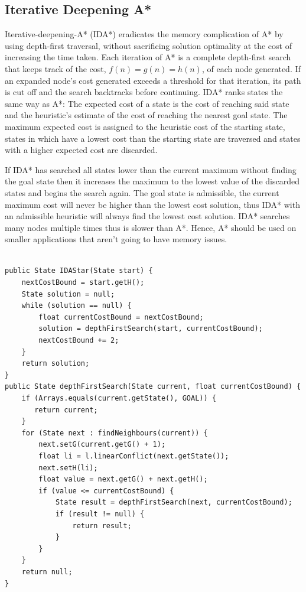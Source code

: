 \documentclass[final]{cmpreport}
\begin{document}
\subsection{Iterative Deepening A*}
Iterative-deepening-A* (IDA*) eradicates the memory complication of A* by using depth-first traversal, without sacrificing solution optimality at the cost of increasing the time taken. Each iteration of A* is a complete depth-first search that keeps track of the cost, $f(n) = g(n) = h(n)$, of each node generated. If an expanded node's cost generated exceeds a threshold for that iteration, its path is cut off and the search backtracks before continuing. IDA* ranks states the same way as A*: The expected cost of a state is the cost of reaching said state and the heuristic's estimate of the cost of reaching the nearest goal state. The maximum expected cost is assigned to the heuristic cost of the starting state, states in which have a lowest cost than the starting state are traversed and states with a higher expected cost are discarded. 


If IDA* has searched all states lower than the current maximum without finding the goal state then it increases the maximum to the lowest value of the discarded states and begins the search again. The goal state is admissible, the current maximum cost will never be higher than the lowest cost solution, thus IDA* with an admissible heuristic will always find the lowest cost solution.  IDA* searches many nodes multiple times thus is slower than A*. Hence, A* should be used on smaller applications that aren't going to have memory issues.

\begin{verbatim}

public State IDAStar(State start) {
    nextCostBound = start.getH();
    State solution = null;
    while (solution == null) {
        float currentCostBound = nextCostBound;
        solution = depthFirstSearch(start, currentCostBound);
        nextCostBound += 2;
    }
    return solution;
}
public State depthFirstSearch(State current, float currentCostBound) {
    if (Arrays.equals(current.getState(), GOAL)) {
       return current;
    }
    for (State next : findNeighbours(current)) {
        next.setG(current.getG() + 1);
        float li = l.linearConflict(next.getState());
        next.setH(li);
        float value = next.getG() + next.getH();
        if (value <= currentCostBound) {
            State result = depthFirstSearch(next, currentCostBound);
            if (result != null) {
                return result;
            }
        }
    }
    return null;
}

\end{verbatim}
\end{document}
